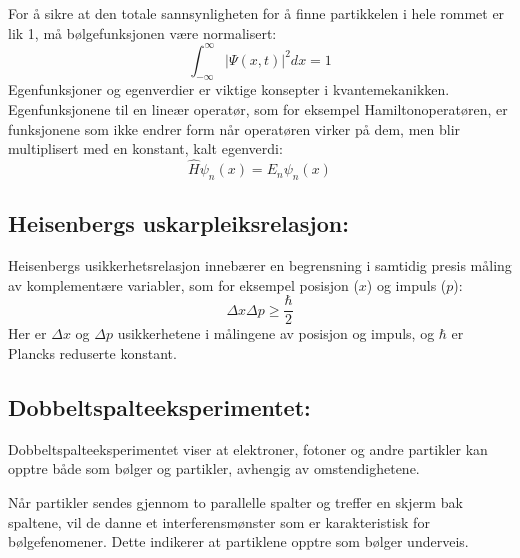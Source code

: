 For å sikre at den totale sannsynligheten for å finne partikkelen i hele rommet er lik 1, må bølgefunksjonen være normalisert:
\begin{equation*}
\int_{-\infty}^{\infty} |\Psi(x,t)|^2 dx = 1
\end{equation*}
Egenfunksjoner og egenverdier er viktige konsepter i kvantemekanikken. Egenfunksjonene til en lineær operatør, som for eksempel Hamiltonoperatøren, er funksjonene som ikke endrer form når operatøren virker på dem, men blir multiplisert med en konstant, kalt egenverdi:
\begin{equation*}
\hat{H}\psi_n(x) = E_n\psi_n(x)
\end{equation*}
\subsection*{Heisenbergs uskarpleiksrelasjon:}

Heisenbergs usikkerhetsrelasjon innebærer en begrensning i samtidig presis måling av komplementære variabler, som for eksempel posisjon ($x$) og impuls ($p$):
\begin{equation*}
\Delta x \Delta p \geq \frac{\hbar}{2}
\end{equation*}
Her er $\Delta x$ og $\Delta p$ usikkerhetene i målingene av posisjon og impuls, og $\hbar$ er Plancks reduserte konstant.

\subsection*{Dobbeltspalteeksperimentet:}
Dobbeltspalteeksperimentet viser at elektroner, fotoner og andre partikler kan opptre både som bølger og partikler, avhengig av omstendighetene.

Når partikler sendes gjennom to parallelle spalter og treffer en skjerm bak spaltene, vil de danne et interferensmønster som er karakteristisk for bølgefenomener. Dette indikerer at partiklene opptre som bølger underveis. 